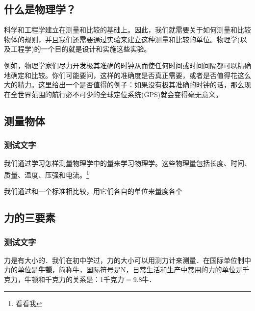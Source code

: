 \begin{paracol}{2}
	\subsection{什么是物理学？}

	
	科学和工程学建立在测量和比较的基础上。因此，我们就需要关于如何测量和比较物体的规则，并且我们还需要通过实验来建立这种测量和比较的单位。物理学(以及工程学)的一个目的就是设计和实施这些实验。
	
	例如，物理学家们尽力开发极其准确的时钟从而使任何时间或时间间隔都可以精确地确定和比较。你们可能要问，这样的准确度是否真正需要，或者是否值得花这么大的精力。这里给出一个是否值得的例子：如果没有极其准确的时钟的话，那么现在全世界范围的航行必不可少的全球定位系统(GPS)就会变得毫无意义。
	
	\subsection{测量物体}
	\NoteArea
	
	\subsubsection{测试文字}
	
	我们通过学习怎样测量物理学中的量来学习物理学。这些物理量包括长度、时间、质量、温度、压强和电流。\footnote{看看我}
	
	我们通过和一个标准相比较，用它们各自的单位来量度各个
	
	
	
	
	
\end{paracol}

\subsection{力的三要素}


\subsubsection{测试文字}

力是有大小的．我们在初中学过，力的大小可以用测力计来测量．在国际单位制中力的单位是\textbf{牛顿}，简称牛，国际符号是N，日常生活和生产中常用的力的单位是千克力，牛顿和千克力的关系是：1千克力$=9.8$牛．

